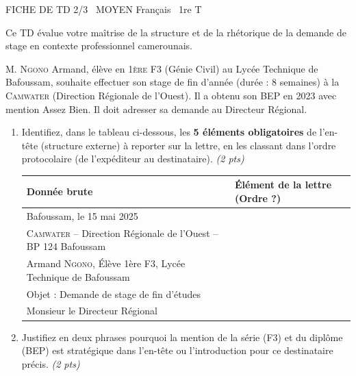 \documentclass[11pt]{article}
\begin{document}
\begin{tcolorbox}[enhanced,colback=popink,colframe=popink,arc=10pt,boxrule=0pt,left=12pt,right=12pt,top=9pt,bottom=9pt]
{\color{white}\popxbold\small FICHE DE TD 2/3 \textbullet\ MOYEN \hfill Français \textbullet\ 1re T\par}
\end{tcolorbox}
\vspace{4pt}
Ce TD évalue votre maîtrise de la structure et de la rhétorique de la demande de stage en contexte professionnel camerounais.

\begin{exercice}
M. \textsc{Ngono} Armand, élève en \textsc{1ère} F3 (Génie Civil) au Lycée Technique de Bafoussam, souhaite effectuer son stage de fin d'année (durée : 8 semaines) à la \textsc{Camwater} (Direction Régionale de l'Ouest). Il a obtenu son BEP en 2023 avec mention Assez Bien. Il doit adresser sa demande au Directeur Régional.

\begin{enumerate}
    \item Identifiez, dans le tableau ci-dessous, les \textbf{5 éléments obligatoires} de l'en-tête (structure externe) à reporter sur la lettre, en les classant dans l'ordre protocolaire (de l'expéditeur au destinataire). \textit{(2 pts)}
    
    \begin{tabularx}{\linewidth}{@{}lX@{}}
    \toprule
    Donnée brute & Élément de la lettre (Ordre ?) \\
    \midrule
    Bafoussam, le 15 mai 2025 & \\
    \textsc{Camwater} -- Direction Régionale de l'Ouest -- BP 124 Bafoussam & \\
    Armand \textsc{Ngono}, Élève 1ère F3, Lycée Technique de Bafoussam & \\
    Objet : Demande de stage de fin d'études & \\
    Monsieur le Directeur Régional & \\
    \bottomrule
    \end{tabularx}

    \item Justifiez en deux phrases pourquoi la mention de la série (F3) et du diplôme (BEP) est stratégique dans l'en-tête ou l'introduction pour ce destinataire précis. \textit{(2 pts)}
\end{enumerate}
\end{exercice}
\end{document}
